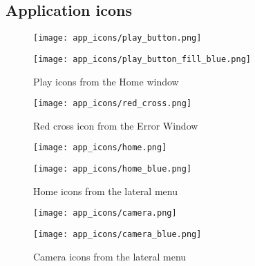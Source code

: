 \begin{appendices}

\chapter{Application icons}
\label{ch:appendix_a}

\begin{figure*}[h!t]
	\centering
	\begin{multicols}{4}
		\hspace{\linewidth} 
	    \texttt{[image: app\_icons/play\_button.png]}\par 
	    \texttt{[image: app\_icons/play\_button\_fill\_blue.png]}\par 
	    \hspace{\linewidth}
    \end{multicols}
	\caption{Play icons from the Home window}
\end{figure*}

\begin{figure*}[h!t]
	\centering
	\texttt{[image: app\_icons/red\_cross.png]}
	\caption{Red cross icon from the Error Window}
\end{figure*}

\begin{figure*}[h!t]
	\centering
	\begin{multicols}{4}
		\hspace{\linewidth} 
	    \texttt{[image: app\_icons/home.png]}\par 
	    \texttt{[image: app\_icons/home\_blue.png]}\par 
	    \hspace{\linewidth}
    \end{multicols}
	\caption{Home icons from the lateral menu}
\end{figure*}


\begin{figure*}[h!t]
	\centering
	\begin{multicols}{4}
		\hspace{\linewidth} 
	    \texttt{[image: app\_icons/camera.png]}\par 
	    \texttt{[image: app\_icons/camera\_blue.png]}\par 
	    \hspace{\linewidth}
    \end{multicols}
	\caption{Camera icons from the lateral menu}
\end{figure*}


\end{appendices}
